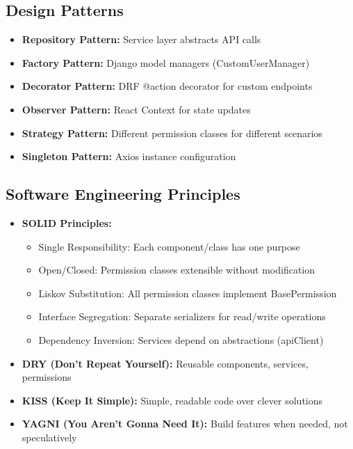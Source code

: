 \documentclass[11pt,a4paper]{article}
\begin{document}
\subsection{Design Patterns}
\begin{itemize}[leftmargin=*]
    \item \textbf{Repository Pattern:} Service layer abstracts API calls
    \item \textbf{Factory Pattern:} Django model managers (CustomUserManager)
    \item \textbf{Decorator Pattern:} DRF @action decorator for custom endpoints
    \item \textbf{Observer Pattern:} React Context for state updates
    \item \textbf{Strategy Pattern:} Different permission classes for different scenarios
    \item \textbf{Singleton Pattern:} Axios instance configuration
\end{itemize}

\subsection{Software Engineering Principles}
\begin{itemize}[leftmargin=*]
    \item \textbf{SOLID Principles:}
    \begin{itemize}
        \item Single Responsibility: Each component/class has one purpose
        \item Open/Closed: Permission classes extensible without modification
        \item Liskov Substitution: All permission classes implement BasePermission
        \item Interface Segregation: Separate serializers for read/write operations
        \item Dependency Inversion: Services depend on abstractions (apiClient)
    \end{itemize}
    \item \textbf{DRY (Don't Repeat Yourself):} Reusable components, services, permissions
    \item \textbf{KISS (Keep It Simple):} Simple, readable code over clever solutions
    \item \textbf{YAGNI (You Aren't Gonna Need It):} Build features when needed, not speculatively
\end{itemize}
\end{document}
